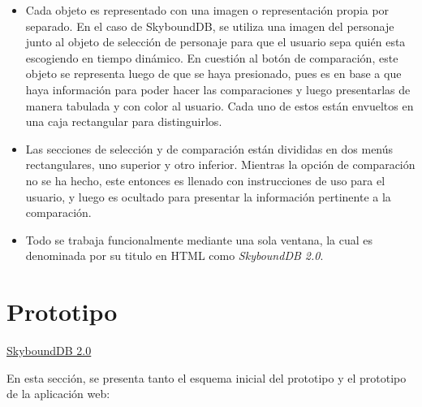 \begin{itemize}
\begin{itemize}
    \end{itemize}
    \item Cada objeto es representado con una imagen o representación propia por separado. En el caso de SkyboundDB, se utiliza una imagen del personaje junto al objeto de selección de personaje para que el usuario sepa quién esta escogiendo en tiempo dinámico. En cuestión al botón de comparación, este objeto se representa luego de que se haya presionado, pues es en base a que haya información para poder hacer las comparaciones y luego presentarlas de manera tabulada y con color al usuario. Cada uno de estos están envueltos en una caja rectangular para distinguirlos.
    \item Las secciones de selección y de comparación están divididas en dos menús rectangulares, uno superior y otro inferior. Mientras la opción de comparación no se ha hecho, este entonces es llenado con instrucciones de uso para el usuario, y luego es ocultado para presentar la información pertinente a la comparación.
    \item Todo se trabaja funcionalmente mediante una sola ventana, la cual es denominada por su titulo en HTML como \textit{SkyboundDB 2.0}.
\end{itemize}

\section{Prototipo}



\href{https://aramis-matos.github.io/skyboundDB2.0/}{SkyboundDB 2.0}

En esta sección, se presenta tanto el esquema inicial del prototipo y el prototipo de la aplicación web:

